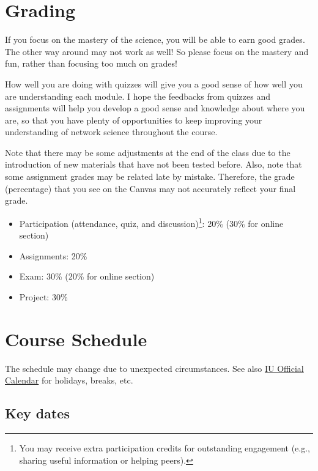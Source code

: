 \documentclass[11pt,article,oneside]{memoir} %
\begin{document}
\section{Grading}\label{sec:grading_tentative} %

If you focus on the mastery of the science, you will be able to earn good grades. The other way around may not work as well! So please focus on the mastery and fun, rather than focusing too much on grades! 

How well you are doing with quizzes will give you a good sense of how well you are understanding each module. I hope the feedbacks from quizzes and assignments will help you develop a good sense and knowledge about where you are, so that you have plenty of opportunities to keep improving your understanding of network science throughout the course. 

Note that there may be some adjustments at the end of the class due to the introduction of new materials that have not been tested before. Also, note that some assignment grades may be related late by mistake. Therefore, the grade (percentage) that you see on the Canvas may not accurately reflect your final grade.

\vspace{-10pt}
\begin{itemize}\itemsep=0pt

\item Participation (attendance, quiz, and discussion)\footnote{You may receive extra participation credits for outstanding engagement (e.g., sharing useful information or helping peers).}: 20\%  (30\% for online section)

\item Assignments: 20\%

\item Exam: 30\% (20\% for online section)

\item Project: 30\%

\end{itemize}
\section{Course Schedule} %

The schedule may change due to unexpected circumstances. See also \href{https://registrar.indiana.edu/official-calendar/index.shtml}{IU Official Calendar} for holidays, breaks, etc. 

\subsection{Key dates}\label{sub:key_dates} %
\end{document}
